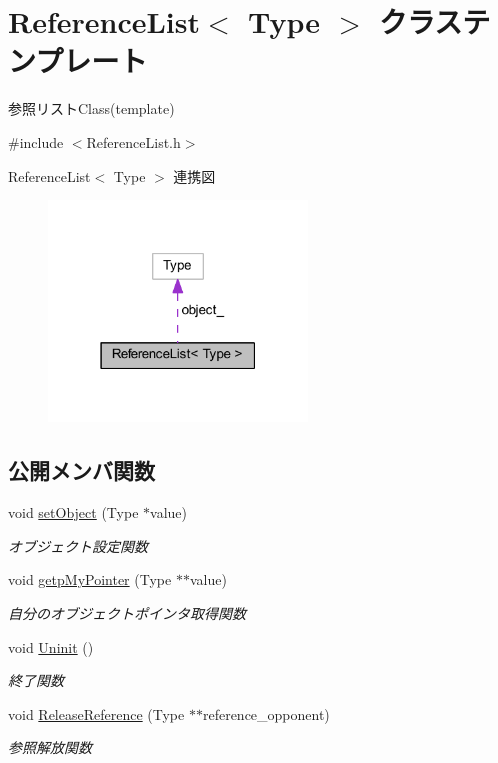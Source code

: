 \hypertarget{class_reference_list}{}\section{Reference\+List$<$ Type $>$ クラステンプレート}
\label{class_reference_list}


参照リスト\+Class(template)  




{\ttfamily \#include $<$Reference\+List.\+h$>$}



Reference\+List$<$ Type $>$ 連携図\nopagebreak
\begin{figure}[H]
\begin{center}
\leavevmode
\includegraphics[width=195pt]{class_reference_list__coll__graph}
\end{center}
\end{figure}
\subsection*{公開メンバ関数}
\begin{DoxyCompactItemize}
\item 
void \mbox{\hyperlink{class_reference_list_ab7e9c83c0d79b4a9d62c4e678243e632}{set\+Object}} (Type $\ast$value)
\begin{DoxyCompactList}\small\item\em オブジェクト設定関数 \end{DoxyCompactList}\item 
void \mbox{\hyperlink{class_reference_list_a4ea7062b9314814866c9b3990ea59e49}{getp\+My\+Pointer}} (Type $\ast$$\ast$value)
\begin{DoxyCompactList}\small\item\em 自分のオブジェクトポインタ取得関数 \end{DoxyCompactList}\item 
void \mbox{\hyperlink{class_reference_list_a549cf7b92db6d920fc9a92c2ad33f0c5}{Uninit}} ()
\begin{DoxyCompactList}\small\item\em 終了関数 \end{DoxyCompactList}\item 
void \mbox{\hyperlink{class_reference_list_a56ce3eb1b8a5b80325dd99a2e4d767c6}{Release\+Reference}} (Type $\ast$$\ast$reference\+\_\+opponent)
\begin{DoxyCompactList}\small\item\em 参照解放関数 \end{DoxyCompactList}\end{DoxyCompactItemize}
